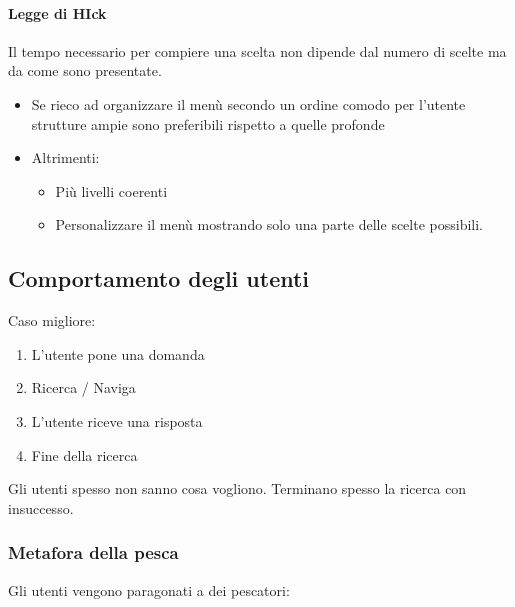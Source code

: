 \documentclass[]{TWDocumentFull}
\providecommand{\tightlist}{%
  \setlength{\itemsep}{0pt}\setlength{\parskip}{0pt}}
\let\oldparagraph\paragraph
\renewcommand{\paragraph}[1]{\oldparagraph{#1}\mbox{}}
\begin{document}
\hypertarget{legge-di-hick}{%
\paragraph{Legge di HIck}\label{legge-di-hick}}

Il tempo necessario per compiere una scelta non dipende dal numero di
scelte ma da come sono presentate.

\begin{itemize}
\tightlist
\item
  Se rieco ad organizzare il menù secondo un ordine comodo per l'utente
  strutture ampie sono preferibili rispetto a quelle profonde
\item
  Altrimenti:

  \begin{itemize}
  \tightlist
  \item
    Più livelli coerenti
  \item
    Personalizzare il menù mostrando solo una parte delle scelte
    possibili.
  \end{itemize}
\end{itemize}

\hypertarget{comportamento-degli-utenti}{%
\subsection{Comportamento degli
utenti}\label{comportamento-degli-utenti}}

Caso migliore:

\begin{enumerate}
\def\labelenumi{\arabic{enumi}.}
\tightlist
\item
  L'utente pone una domanda
\item
  Ricerca / Naviga
\item
  L'utente riceve una risposta
\item
  Fine della ricerca
\end{enumerate}

Gli utenti spesso non sanno cosa vogliono. Terminano spesso la ricerca
con insuccesso.

\hypertarget{metafora-della-pesca}{%
\subsubsection{Metafora della pesca}\label{metafora-della-pesca}}

Gli utenti vengono paragonati a dei pescatori:
\end{document}
